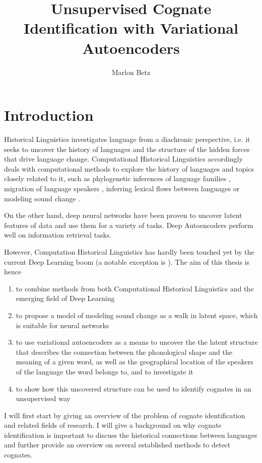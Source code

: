 \documentclass[8pt]{article}
\title{Unsupervised Cognate Identification with Variational Autoencoders}
\author{Marlon Betz}
\begin{document}
\maketitle
\newpage
\tableofcontents
\newpage

\section{Introduction}

Historical Linguistics investigates language from a diachronic perspective, i.e. it seeks to uncover the history of languages and the structure of the hidden forces that drive language change.  Computational Historical Linguistics accordingly deals with computational methods to explore the history of languages and topics closely related to it, such as phylogenetic inferences of language families \cite{bouckaert2012mapping}, migration of language speakers \cite{gray2009language}, inferring lexical flows between languages \cite{dellert2015uralic} or modeling sound change \cite{bouchard2013automated}.  

On the other hand, deep neural networks have been proven to uncover latent features of data and use them for a variety of tasks. Deep Autoencoders perform well on information retrieval tasks.


 However, Computation Historical Linguistics has hardly been touched yet by the current Deep Learning boom (a notable exception is \cite{rama2016siamese}). 
The aim of this thesis is hence 
\begin{enumerate}
\item to combine methods from both Computational Historical Linguistics and the emerging field of Deep Learning
\item to propose a model of modeling sound change as a walk in latent space, which is suitable for neural networks
\item to use variational autoencoders as a means to uncover the the latent structure that describes the connection between the phonological shape and the meaning of a given word, as well as the geographical location of the speakers of the language the word belongs to, and to investigate it
\item to show how this uncovered structure can be used to identify cognates in an unsupervised way
\end{enumerate}

I will first start by giving an overview of the problem of cognate identification and related fields of research. I will give a background on why cognate identification is important to discuss the historical connections between languages and further provide an overview on several established methods to detect cognates.  
\end{document}
